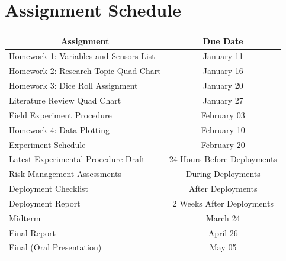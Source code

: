 \documentclass[
	letterpaper, %
	fontsize=10pt, %
	twoside=true, %
	numbers=noenddot, %
]{kaobook}
\begin{document}
\section*{Assignment Schedule} 
\begin{table}[h!] 
    \begin{tabular}{ l | c }
        \toprule
        \multicolumn{1}{c|}{\textbf{Assignment}} & \textbf{Due Date} \\
        \midrule
        Homework 1: Variables and Sensors List                      & January 11    \\
        Homework 2: Research Topic Quad Chart                       & January 16    \\
        Homework 3: Dice Roll Assignment                            & January 20    \\
        Literature Review Quad Chart\footnotemark[2]                & January 27    \\
        Field Experiment Procedure                                  & February 03   \\
        Homework 4: Data Plotting                                   & February 10   \\
        Experiment Schedule                                         & February 20   \\
        Latest Experimental Procedure Draft                         & 24 Hours Before Deployments \\
        Risk Management Assessments                                 & During Deployments \\
        Deployment Checklist                                          & After Deployments \\
        Deployment Report                                           & 2 Weeks After Deployments \\
        Midterm                                                     & March 24 \\
        Final Report                                                & April 26 \\
        Final (Oral Presentation)                                   & May 05 \\
        \bottomrule
    \end{tabular}
\end{table}
\end{document}
